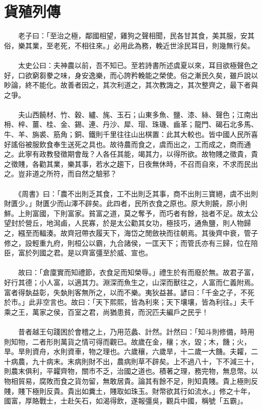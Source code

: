 \section{貨殖列傳}
　　老子曰：「至治之極，鄰國相望，雞狗之聲相聞，民各甘其食，美其服，安其俗，樂其業，至老死，不相往來。」必用此為務，輓近世涂民耳目，則幾無行矣。
\\\\
　　太史公曰：夫神農以前，吾不知已。至若詩書所述虞夏以來，耳目欲極聲色之好，口欲窮芻豢之味，身安逸樂，而心誇矜輓能之榮使。俗之漸民久矣，雖戶說以眇論，終不能化。故善者因之，其次利道之，其次教誨之，其次整齊之，最下者與之爭。
\\\\
　　夫山西饒材、竹、穀、纑、旄、玉石；山東多魚、鹽、漆、絲、聲色；江南出枏、梓、薑、桂、金、錫、連、丹沙、犀、瑁、珠璣、齒革；龍門、碣石北多馬、牛、羊、旃裘、筋角；銅、鐵則千里往往山出棋置：此其大較也。皆中國人民所喜好謠俗被服飲食奉生送死之具也。故待農而食之，虞而出之，工而成之，商而通之。此寧有政教發徵期會哉？人各任其能，竭其力，以得所欲。故物賤之徵貴，貴之徵賤，各勸其業，樂其事，若水之趨下，日夜無休時，不召而自來，不求而民出之。豈非道之所符，而自然之驗邪？
\\\\
　　《周書》曰：「農不出則乏其食，工不出則乏其事，商不出則三寶絕，虞不出則財匱少。」財匱少而山澤不辟矣。此四者，民所衣食之原也。原大則饒，原小則鮮。上則富國，下則富家。貧富之道，莫之奪予，而巧者有餘，拙者不足。故太公望封於營丘，地澙鹵，人民寡，於是太公勸其女功，極技巧，通魚鹽，則人物歸之，繦至而輻湊。故齊冠帶衣履天下，海岱之閒斂袂而往朝焉。其後齊中衰，管子修之，設輕重九府，則桓公以霸，九合諸侯，一匡天下；而管氏亦有三歸，位在陪臣，富於列國之君。是以齊富彊至於威、宣也。
\\\\
　　故曰：「倉廩實而知禮節，衣食足而知榮辱。」禮生於有而廢於無。故君子富，好行其德；小人富，以適其力。淵深而魚生之，山深而獸往之，人富而仁義附焉。富者得埶益彰，失埶則客無所之，以而不樂。夷狄益甚。諺曰：「千金之子，不死於市。」此非空言也。故曰：「天下熙熙，皆為利來；天下壤壤，皆為利往。」夫千乘之王，萬家之侯，百室之君，尚猶患貧，而況匹夫編戶之民乎！
\\\\
　　昔者越王句踐困於會稽之上，乃用范蠡、計然。計然曰：「知斗則修備，時用則知物，二者形則萬貨之情可得而觀已。故歲在金，穰；水，毀；木，饑；火，旱。旱則資舟，水則資車，物之理也。六歲穰，六歲旱，十二歲一大饑。夫糶，二十病農，九十病末。末病則財不出，農病則草不辟矣。上不過八十，下不減三十，則農末俱利，平糶齊物，關市不乏，治國之道也。積著之理，務完物，無息幣。以物相貿易，腐敗而食之貨勿留，無敢居貴。論其有餘不足，則知貴賤。貴上極則反賤，賤下極則反貴。貴出如糞土，賤取如珠玉。財幣欲其行如流水。」修之十年，國富，厚賂戰士，士赴矢石，如渴得飲，遂報彊吳，觀兵中國，稱號「五霸」。
